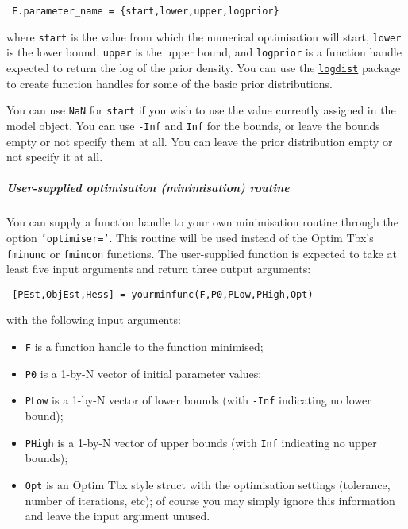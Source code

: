  \begin{verbatim}
 E.parameter_name = {start,lower,upper,logprior}
 \end{verbatim}
 
 where \texttt{start} is the value from which the numerical optimisation
 will start, \texttt{lower} is the lower bound, \texttt{upper} is the
 upper bound, and \texttt{logprior} is a function handle expected to
 return the log of the prior density. You can use the
 \href{logdist/Contents}{\texttt{logdist}} package to create function
 handles for some of the basic prior distributions.
 
 You can use \texttt{NaN} for \texttt{start} if you wish to use the value
 currently assigned in the model object. You can use \texttt{-Inf} and
 \texttt{Inf} for the bounds, or leave the bounds empty or not specify
 them at all. You can leave the prior distribution empty or not specify
 it at all.
 
 \subparagraph{User-supplied optimisation (minimisation) routine}
 
 You can supply a function handle to your own minimisation routine
 through the option \texttt{'optimiser='}. This routine will be used
 instead of the Optim Tbx's \texttt{fminunc} or \texttt{fmincon}
 functions. The user-supplied function is expected to take at least five
 input arguments and return three output arguments:
 
 \begin{verbatim}
 [PEst,ObjEst,Hess] = yourminfunc(F,P0,PLow,PHigh,Opt)
 \end{verbatim}
 
 with the following input arguments:
 
 \begin{itemize}
 \item
   \texttt{F} is a function handle to the function minimised;
 \item
   \texttt{P0} is a 1-by-N vector of initial parameter values;
 \item
   \texttt{PLow} is a 1-by-N vector of lower bounds (with \texttt{-Inf}
   indicating no lower bound);
 \item
   \texttt{PHigh} is a 1-by-N vector of upper bounds (with \texttt{Inf}
   indicating no upper bounds);
 \item
   \texttt{Opt} is an Optim Tbx style struct with the optimisation
   settings (tolerance, number of iterations, etc); of course you may
   simply ignore this information and leave the input argument unused.
 \end{itemize}
 
